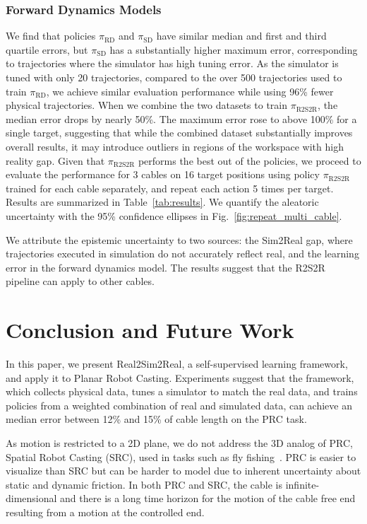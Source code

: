 \documentclass[letterpaper, 10pt, conference]{ieeeconf}  %
\newcommand{\pitune}{\pi_\textrm{R2S2R}}
\newcommand{\pisim}{\pi_\textrm{SD}}
\newcommand{\pireal}{\pi_\textrm{RD}}
\begin{document}
\subsubsection{Forward Dynamics Models} We find that policies $\pireal$ and $\pisim$ have similar median and first and third quartile errors, but $\pisim$ has a substantially higher maximum error, corresponding to trajectories where the simulator has high tuning error.
As the simulator is tuned with only 20 trajectories, compared to the over 500 trajectories used to train $\pireal$, we achieve similar evaluation performance while using 96\% fewer physical trajectories. When we combine the two datasets to train $\pitune$, the median error drops by nearly 50\%. The maximum error rose to above 100\% for a single target, suggesting that while the combined dataset substantially improves overall results, it may introduce outliers in regions of the workspace with high reality gap. 
Given that $\pitune$ performs the best out of the policies, we proceed to evaluate the performance for 3 cables on 16 target positions using policy $\pitune$ trained for each cable separately, and repeat each action 5 times per target. Results are summarized in Table~\ref{tab:results}. We quantify the aleatoric uncertainty with the 95\% confidence ellipses in Fig.~\ref{fig:repeat_multi_cable}. 

We attribute the epistemic uncertainty to two sources: the Sim2Real gap, where trajectories executed in simulation do not accurately reflect real, and the learning error in the forward dynamics model. The results suggest that the R2S2R pipeline can apply to other cables.


\section{Conclusion and Future Work}\label{sec:conclusion}

In this paper, we present Real2Sim2Real, a self-supervised learning framework, and apply it to Planar Robot Casting. Experiments suggest that the framework, which collects physical data, tunes a simulator to match the real data, and trains policies from a weighted combination of real and simulated data, can achieve an median error between 12\% and 15\% of cable length on the PRC task.

As motion is restricted to a 2D plane, we do not address the 3D analog of PRC, Spatial Robot Casting (SRC), used in tasks such as fly fishing~\cite{fly_fishing_2004}. PRC is easier to visualize than SRC but can be harder to model due to inherent uncertainty about static and dynamic friction. In both PRC and SRC, the cable is infinite-dimensional and there is a long time horizon for the motion of the cable free end resulting from a motion at the controlled end. 
\end{document}
